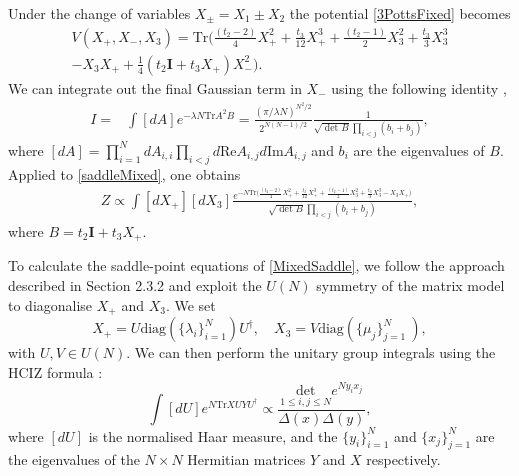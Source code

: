 Under the change of variables $X_{\pm} = X_1 \pm X_2$ the potential \eqref{3PottsFixed} becomes
%
\begin{multline}
    \label{saddleMixed}
    V(X_+,X_-,X_3)  = \text{Tr}\bigg( \frac{(t_2-2)}{4}X_+^2 + \frac{t_3}{12} X_+^3 + \frac{(t_2-1)}{2} X_3^2 + \frac{t_3}{3} X_3^3 \\
    - X_3 X_+ + \frac{1}{4}(t_2 \mathbf{I} + t_3 X_+)X_-^2 \bigg).
\end{multline}
%
We can integrate out the final Gaussian term in $X_-$ using the following identity
\cite{Eynard:1992cn},
\begin{align}
    I = & \int[dA] e^{-\lambda N \text{Tr} A^2 B} = \frac{(\pi/\lambda N)^{N^2/2}}{2^{N(N-1)/2}} \frac{1}{\sqrt{\det{B}} \prod_{i<j} (b_i + b_j)},
\end{align}
where $[dA]=\prod_{i=1}^N dA_{i,i} \prod_{i<j} d \text{Re} A_{i,j} d \text{Im} A_{i,j} $ and $b_i$
are the eigenvalues of $B$. Applied to \eqref{saddleMixed}, one obtains
\begin{align}
    \label{MixedSaddle}
    Z \propto \int [dX_+][dX_3] \frac{e^{-N\text{Tr} \bigg( \frac{(t_2-2)}{4}X_+^2 + \frac{t_3}{12} X_+^3 + \frac{(t_2-1)}{2} X_3^2 + \frac{t_3}{3} X_3^3 - X_3 X_+\bigg)}}{\sqrt{\det{B}}\prod_{i<j} (b_i + b_j)},
\end{align}
where $B=t_2 \mathbf{I} + t_3X_+$.

To calculate the saddle-point equations of \eqref{MixedSaddle}, we follow the approach described in
Section 2.3.2 and exploit the $U(N)$ symmetry of the matrix model to diagonalise $X_+$ and $X_3$.
We set
%
\begin{equation}
    \label{diagMixed}
    X_+ = U\text{diag}\left(\{\lambda_i\}_{i=1}^N\right)U^{\dagger}, \quad X_3 = V\text{diag}\left( \{ \mu_j \}_{j=1}^N\ \right),
\end{equation}
%
with $U,V\in U(N)$. We can then perform the unitary group integrals using the HCIZ formula
\cite{Harish-Chandra538,Itzykson1979}:
%
\begin{equation}
    \label{HCIZ}
    \int [dU] e^{N\text{Tr} X U Y U^\dagger} \propto \frac{\underset{1\leqslant i,j\leqslant N}{\text{det}} e^{Ny_i x_j} }{\Delta(x)\Delta(y)},
\end{equation}
%
where $[dU]$ is the normalised Haar measure, and the $\{y_i\}_{i=1}^N$ and $\{x_j\}_{j=1}^N$ are
the eigenvalues of the $N\times N$ Hermitian matrices $Y$ and $X$ respectively.

